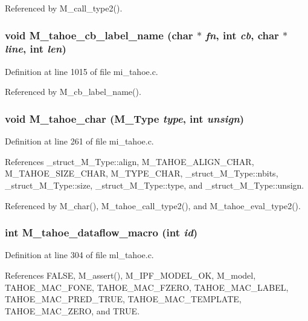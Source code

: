 Referenced by M\_\-call\_\-type2().
\subsubsection{\setlength{\rightskip}{0pt plus 5cm}void M\_\-tahoe\_\-cb\_\-label\_\-name (char $\ast$ {\em fn}, int {\em cb}, char $\ast$ {\em line}, int {\em len})}\label{m__tahoe_8h_560c43663569b5e87f35ac39699c53c7}




Definition at line 1015 of file mi\_\-tahoe.c.

Referenced by M\_\-cb\_\-label\_\-name().
\subsubsection{\setlength{\rightskip}{0pt plus 5cm}void M\_\-tahoe\_\-char (\bf{M\_\-Type} {\em type}, int {\em unsign})}\label{m__tahoe_8h_5697c3ce4a7a5a7560d40675f73427c2}




Definition at line 261 of file mi\_\-tahoe.c.

References \_\-struct\_\-M\_\-Type::align, M\_\-TAHOE\_\-ALIGN\_\-CHAR, M\_\-TAHOE\_\-SIZE\_\-CHAR, M\_\-TYPE\_\-CHAR, \_\-struct\_\-M\_\-Type::nbits, \_\-struct\_\-M\_\-Type::size, \_\-struct\_\-M\_\-Type::type, and \_\-struct\_\-M\_\-Type::unsign.

Referenced by M\_\-char(), M\_\-tahoe\_\-call\_\-type2(), and M\_\-tahoe\_\-eval\_\-type2().
\subsubsection{\setlength{\rightskip}{0pt plus 5cm}int M\_\-tahoe\_\-dataflow\_\-macro (int {\em id})}\label{m__tahoe_8h_065f72221d34587845c36c927f067b84}




Definition at line 304 of file ml\_\-tahoe.c.

References FALSE, M\_\-assert(), M\_\-IPF\_\-MODEL\_\-OK, M\_\-model, TAHOE\_\-MAC\_\-FONE, TAHOE\_\-MAC\_\-FZERO, TAHOE\_\-MAC\_\-LABEL, TAHOE\_\-MAC\_\-PRED\_\-TRUE, TAHOE\_\-MAC\_\-TEMPLATE, TAHOE\_\-MAC\_\-ZERO, and TRUE.

